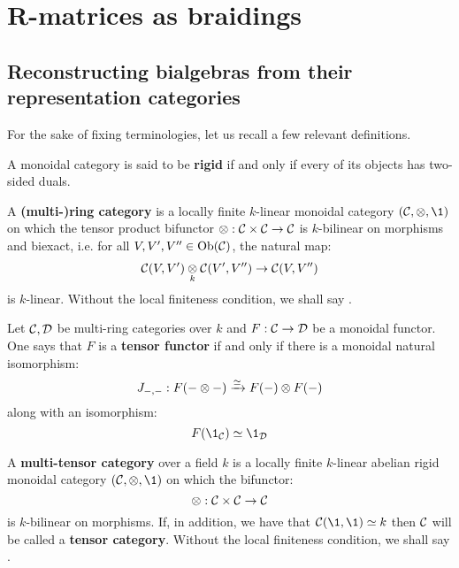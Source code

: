 \section{R-matrices as braidings}
    \subsection{Reconstructing bialgebras from their representation categories}
        For the sake of fixing terminologies, let us recall a few relevant definitions.
        \begin{definition} \label{def: rigid_monoidal_categories}
            A monoidal category is said to be \textbf{rigid} if and only if every of its objects has two-sided duals. 
        \end{definition}
        \begin{definition} \label{def: ring_categories}
            \cite[Definition 4.1.1]{EGNO_tensor_categories} A \textbf{(multi-)ring category} is a locally finite $k$-linear monoidal category $(\C, \tensor, \1)$ on which the tensor product bifunctor $\tensor: \C \x \C \to \C$ is $k$-bilinear on morphisms and biexact, i.e. for all $V, V', V'' \in \mathrm{Ob}(\mathcal{C})$, the natural map:
                $$\C(V, V') \tensor_k \C(V', V'') \to \C(V, V'')$$
            is $k$-linear. Without the local finiteness condition, we shall say .
        \end{definition}
        \begin{definition} \label{def: tensor_functors}
            Let $\mathcal{C}, \mathcal{D}$ be multi-ring categories over $k$ and $F: \mathcal{C} \to \mathcal{D}$ be a monoidal functor. One says that $F$ is a \textbf{tensor functor} if and only if there is a monoidal natural isomorphism:
                $$J_{-, -}: F(- \tensor -) \xrightarrow[]{\cong} F(-) \tensor F(-)$$
            along with an isomorphism:
                $$F(\1_{\C}) \cong \1_{\D}$$
        \end{definition}
        \begin{definition} \label{def: tensor_categories}
            \cite[Definition 4.1.1]{EGNO_tensor_categories} A  \textbf{multi-tensor category} over a field $k$ is a locally finite $k$-linear abelian rigid monoidal category $(\C, \tensor, \1)$ on which the bifunctor:
                $$\tensor: \C \x \C \to \C$$
            is $k$-bilinear on morphisms. If, in addition, we have that $\C(\1, \1) \cong k$ then $\mathcal{C}$ will be called a \textbf{tensor category}. Without the local finiteness condition, we shall say .
        \end{definition}
